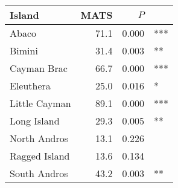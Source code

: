
\begin{tabular}{lrrl}
\toprule
Island & MATS & $P$ & \\
\midrule
Abaco & 71.1 & 0.000 & ***\\
Bimini & 31.4 & 0.003 & **\\
Cayman Brac & 66.7 & 0.000 & ***\\
Eleuthera & 25.0 & 0.016 & *\\
Little Cayman & 89.1 & 0.000 & ***\\
Long Island & 29.3 & 0.005 & **\\
North Andros & 13.1 & 0.226 & \\
Ragged Island & 13.6 & 0.134 & \\
South Andros & 43.2 & 0.003 & **\\
\bottomrule
\end{tabular}
